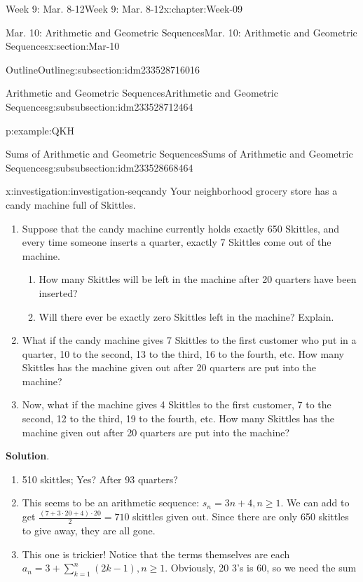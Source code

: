 \documentclass[oneside,10pt,]{book}
\newcommand{\blocktitlefont}{\relax}
\numberwithin{equation}{section}
\renewcommand{\ge}{\geqslant}
\begin{document}
\begin{chapterptx}{Week 9: Mar. 8-12}{}{Week 9: Mar. 8-12}{}{}{x:chapter:Week-09}
\begin{sectionptx}{Mar. 10: Arithmetic and Geometric Sequences}{}{Mar. 10: Arithmetic and Geometric Sequences}{}{}{x:section:Mar-10}
\begin{subsectionptx}{Outline}{}{Outline}{}{}{g:subsection:idm233528716016}
\begin{subsubsectionptx}{Arithmetic and Geometric Sequences}{}{Arithmetic and Geometric Sequences}{}{}{g:subsubsection:idm233528712464}
\begin{example}{}{p:example:QKH}
\begin{enumerate}
\end{enumerate}
%
\end{example}
\end{subsubsectionptx}
%
%
\typeout{************************************************}
\typeout{************************************************}
%
\begin{subsubsectionptx}{Sums of Arithmetic and Geometric Sequences}{}{Sums of Arithmetic and Geometric Sequences}{}{}{g:subsubsection:idm233528668464}
\begin{investigation}{}{x:investigation:investigation-seqcandy}%
Your neighborhood grocery store has a candy machine full of Skittles.%
\begin{enumerate}
\item{}Suppose that the candy machine currently holds exactly 650 Skittles, and every time someone inserts a quarter, exactly 7 Skittles come out of the machine.%
\begin{enumerate}
\item{}How many Skittles will be left in the machine after 20 quarters have been inserted?%
\item{}Will there ever be exactly zero Skittles left in the machine? Explain.%
\end{enumerate}
%
\item{}What if the candy machine gives 7 Skittles to the first customer who put in a quarter, 10 to the second, 13 to the third, 16 to the fourth, etc. How many Skittles has the machine given out after 20 quarters are put into the machine?%
\item{}Now, what if the machine gives 4 Skittles to the first customer, 7 to the second, 12 to the third, 19 to the fourth, etc. How many Skittles has the machine given out after 20 quarters are put into the machine?%
\end{enumerate}
%
\par\smallskip%
\noindent\textbf{\blocktitlefont Solution}.\hypertarget{g:solution:idm233528658768}{}\quad{}%
\begin{enumerate}
\item{}510 skittles; Yes? After 93 quarters?%
\item{}This seems to be an arithmetic sequence: \(s_n = 3n+4, n \ge 1\). We can add to get \(\frac{(7+3\cdot 20+4)\cdot 20}{2} = 710\) skittles given out. Since there are only 650 skittles to give away, they are all gone.%
\item{}This one is trickier! Notice that the terms themselves are each \(a_n  = 3 + \sum_{k=1}^n (2k-1), n\ge 1\). Obviously, 20 3's is 60, so we need the sum%

\end{enumerate}
\end{investigation}
\end{subsubsectionptx}
\end{subsectionptx}
\end{sectionptx}
\end{chapterptx}
\end{document}
